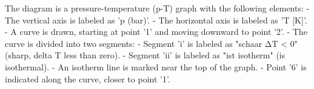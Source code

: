The diagram is a pressure-temperature (p-T) graph with the following elements:  
- The vertical axis is labeled as 'p (bar)'.  
- The horizontal axis is labeled as 'T [K]'.  
- A curve is drawn, starting at point '1' and moving downward to point '2'.  
- The curve is divided into two segments:  
  - Segment 'i' is labeled as "schaar ΔT < 0" (sharp, delta T less than zero).  
  - Segment 'ii' is labeled as "ist isotherm" (is isothermal).  
- An isotherm line is marked near the top of the graph.  
- Point '6' is indicated along the curve, closer to point '1'.